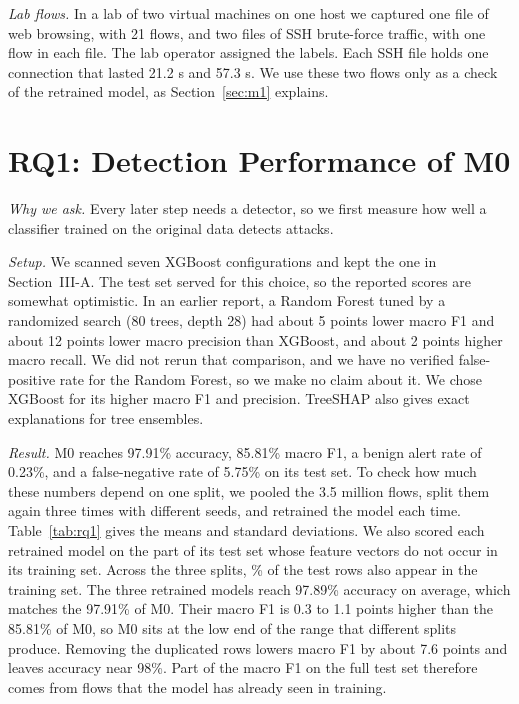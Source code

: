\documentclass[conference]{IEEEtran}
\begin{document}
\textit{Lab flows.} In a lab of two virtual machines on one host we captured one file of web browsing, with 21 flows, and two files of SSH brute-force traffic, with one flow in each file. The lab operator assigned the labels. Each SSH file holds one connection that lasted 21.2 s and 57.3 s. We use these two flows only as a check of the retrained model, as Section~\ref{sec:m1} explains.

\section{RQ1: Detection Performance of M0}
\textit{Why we ask.} Every later step needs a detector, so we first measure how well a classifier trained on the original data detects attacks.

\textit{Setup.} We scanned seven XGBoost configurations and kept the one in Section~III-A. The test set served for this choice, so the reported scores are somewhat optimistic. In an earlier report, a Random Forest tuned by a randomized search (80 trees, depth 28) had about 5 points lower macro F1 and about 12 points lower macro precision than XGBoost, and about 2 points higher macro recall. We did not rerun that comparison, and we have no verified false-positive rate for the Random Forest, so we make no claim about it. We chose XGBoost for its higher macro F1 and precision. TreeSHAP also gives exact explanations for tree ensembles.

\textit{Result.} M0 reaches 97.91\% accuracy, 85.81\% macro F1, a benign alert rate of 0.23\%, and a false-negative rate of 5.75\% on its test set. To check how much these numbers depend on one split, we pooled the 3.5 million flows, split them again three times with different seeds, and retrained the model each time. Table~\ref{tab:rq1} gives the means and standard deviations. We also scored each retrained model on the part of its test set whose feature vectors do not occur in its training set. Across the three splits, \rqDupShare\% of the test rows also appear in the training set. The three retrained models reach 97.89\% accuracy on average, which matches the 97.91\% of M0. Their macro F1 is 0.3 to 1.1 points higher than the 85.81\% of M0, so M0 sits at the low end of the range that different splits produce. Removing the duplicated rows lowers macro F1 by about 7.6 points and leaves accuracy near 98\%. Part of the macro F1 on the full test set therefore comes from flows that the model has already seen in training.
\end{document}
